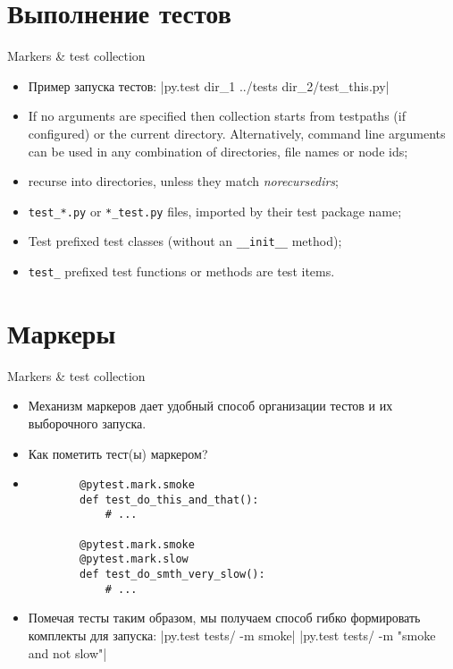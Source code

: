\documentclass{beamer}
\begin{document}
\section{Выполнение тестов}
\begin{frame}[fragile]{Markers \& test collection}
    \begin{itemize}
    \item Пример запуска тестов:
        |py.test dir_1 ../tests dir_2/test_this.py|
    \pause \item If no arguments are specified then collection starts from testpaths (if configured) or the current directory. Alternatively, command line arguments can be used in any combination of directories, file names or node ids;
    \pause \item recurse into directories, unless they match \emph{norecursedirs};
    \pause \item \verb|test_*.py| or \verb|*_test.py| files, imported by their test package name;
    \pause \item Test prefixed test classes (without an \verb|__init__| method);
    \pause \item \verb|test_| prefixed test functions or methods are test items.
    \end{itemize}
\end{frame}

\section{Маркеры}
\begin{frame}[fragile]{Markers \& test collection}
    \begin{itemize}
    \item Механизм маркеров дает удобный способ организации тестов и их выборочного запуска.
    \pause \item Как пометить тест(ы) маркером?
    \pause \item 
        \begin{verbatim}
        @pytest.mark.smoke
        def test_do_this_and_that():
            # ...

        @pytest.mark.smoke
        @pytest.mark.slow
        def test_do_smth_very_slow():
            # ...
        \end{verbatim}
    \pause \item Помечая тесты таким образом, мы получаем способ гибко формировать комплекты для запуска:
        |py.test tests/ -m smoke|
        |py.test tests/ -m "smoke and not slow"|
    \end{itemize}
\end{frame}
\end{document}
